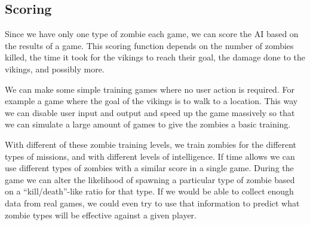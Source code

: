 \subsection{Scoring}
Since we have only one type of zombie each game, we can score the AI based on the results of a game. This scoring function depends on the number of zombies killed, the time it took for the vikings to reach their goal, the damage done to the vikings, and possibly more.

We can make some simple training games where no user action is required. For example a game where the goal of the vikings is to walk to a location. This way we can disable user input and output and speed up the game massively so that we can simulate a large amount of games to give the zombies a basic training.

With different of these zombie training levels, we train zombies for the different types of missions, and with different levels of intelligence. If time allows we can use different types of zombies with a similar score in a single game. During the game we can alter the likelihood of spawning a particular type of zombie based on a ``kill/death''-like ratio for that type. If we would be able to collect enough data from real games, we could even try to use that information to predict what zombie types will be effective against a given player.